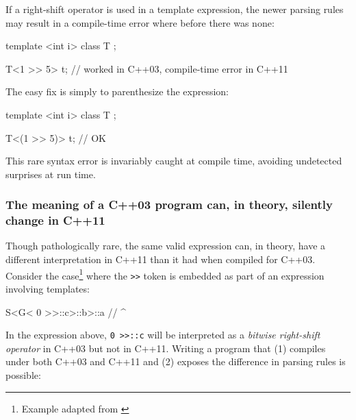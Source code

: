 If a right-shift operator is used in a template expression, the newer
parsing rules may result in a compile-time error where before there was
none:

\begin{emcppshiddenlisting}[emcppsbatch=ped1,emcppsstandards=c++03]
template <int i> class T {};
\end{emcppshiddenlisting}
\begin{emcppslisting}[emcppsbatch=ped1]
T<1 >> 5> t;  // worked in C++03, compile-time error in C++11
\end{emcppslisting}

\noindent The easy fix is simply to parenthesize the expression:

\begin{emcppshiddenlisting}[emcppsbatch=ped2,emcppsstandards={c++11,c++14}]
template <int i> class T {};
\end{emcppshiddenlisting}
\begin{emcppslisting}[emcppsbatch=ped2]
T<(1 >> 5)> t;  // OK
\end{emcppslisting}

\noindent This rare syntax error is invariably caught at compile time, avoiding undetected surprises at run time.

\subsubsection[The meaning of a C++03 program can, in theory, silently change in C++11]{The meaning of a C++03 program can, in theory, silently change in C++11}\label{the-meaning-of-a-c++03-program-can-(in-theory)-silently-change-in-c++11}

Though pathologically rare, the same valid expression can, in theory, have a different interpretation in C++11 than it had when compiled for C++03.
Consider the case{\cprotect\footnote{Example adapted from \cite{gustedt13}}} where the
\lstinline!>>! token is embedded as part of an expression involving
templates:

\begin{emcppslisting}[emcppsignore={Pathological}]
S<G< 0 >>::c>::b>::a
//   ^~~~~~~
\end{emcppslisting}

\noindent In the expression above, \lstinline!0!~\lstinline!>>::c! will be interpreted
as a \emph{bitwise right-shift operator} in C++03 but not in C++11. Writing a program that (1) compiles under both C++03 and
C++11 and (2) exposes the difference in parsing rules is possible:

